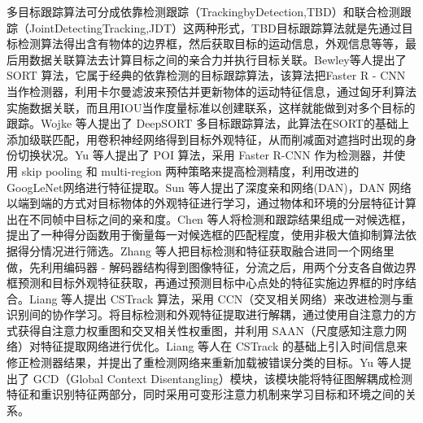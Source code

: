 多目标跟踪算法可分成依靠检测跟踪（TrackingbyDetection,TBD）和联合检测跟踪（JointDetectingTracking,JDT）这两种形式，TBD目标跟踪算法就是先通过目标检测算法得出含有物体的边界框，然后获取目标的运动信息，外观信息等等，最后用数据关联算法去计算目标之间的亲合力并执行目标关联。Bewley等人\cite{bewley2016simple}提出了 SORT 算法，它属于经典的依靠检测的目标跟踪算法，该算法把Faster R - CNN当作检测器，利用卡尔曼滤波来预估并更新物体的运动特征信息，通过匈牙利算法实施数据关联，而且用IOU当作度量标准以创建联系，这样就能做到对多个目标的跟踪。Wojke 等人\cite{wojke2017simple}提出了 DeepSORT 多目标跟踪算法，此算法在SORT的基础上添加级联匹配，用卷积神经网络得到目标外观特征，从而削减面对遮挡时出现的身份切换状况。Yu 等人\cite{yu2016poi}提出了 POI 算法，采用 Faster R-CNN 作为检测器，并使用 skip pooling 和 multi-region 两种策略来提高检测精度，利用改进的 GoogLeNet\cite{szegedy2015going}网络进行特征提取。Sun 等人\cite{sun2019deep}提出了深度亲和网络(DAN)，DAN 网络以端到端的方式对目标物体的外观特征进行学习，通过物体和环境的分层特征计算出在不同帧中目标之间的亲和度。Chen 等人\cite{chen2018real}将检测和跟踪结果组成一对候选框，提出了一种得分函数用于衡量每一对候选框的匹配程度，使用非极大值抑制算法依据得分情况进行筛选。Zhang 等人\cite{zhang2021fairmot}把目标检测和特征获取融合进同一个网络里做，先利用编码器 - 解码器结构得到图像特征，分流之后，用两个分支各自做边界框预测和目标外观特征获取，再通过预测目标中心点处的特征实施边界框的时序结合。Liang 等人\cite{liang2022rethinking}提出 CSTrack 算法，采用 CCN（交叉相关网络）来改进检测与重识别间的协作学习。将目标检测和外观特征提取进行解耦，通过使用自注意力的方式获得自注意力权重图和交叉相关性权重图，并利用 SAAN\cite{zhao2020saan}（尺度感知注意力网络）对特征提取网络进行优化。Liang 等人\cite{liang2022fake}在 CSTrack 的基础上引入时间信息来修正检测器结果，并提出了重检测网络来重新加载被错误分类的目标。Yu 等人\cite{yu2022relationtrack}提出了 GCD（Global Context Disentangling）模块，该模块能将特征图解耦成检测特征和重识别特征两部分，同时采用可变形注意力机制来学习目标和环境之间的关系。

